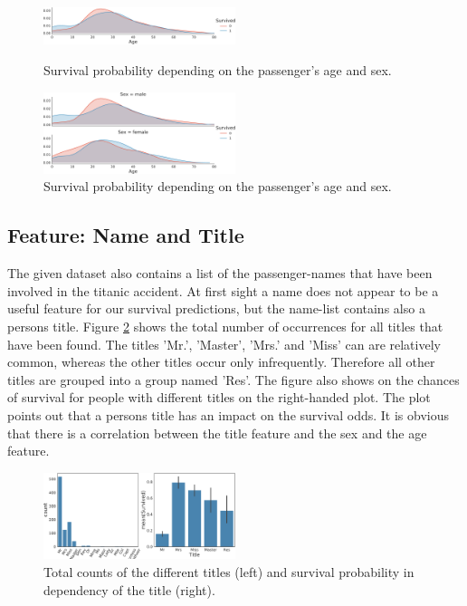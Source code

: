  \begin{figure}

 \centering
     \includegraphics[width=0.5\textwidth]{media_saved/age_all}
     \caption{Survival probability depending on the passenger's age and sex.}
     \label{fig:agesexfeat}
     \includegraphics[width=0.5\textwidth]{media_saved/age_sex}
     \caption{Survival probability depending on the passenger's age and sex.}
     \label{fig:ageallfeat}
 \end{figure}
 
 \subsection{Feature: Name and Title}
The given dataset also contains a list of the passenger-names that have been involved in the titanic accident. At first sight a name does not appear to be a useful feature for our survival predictions, but the name-list contains also a persons title. Figure \ref{fig:title} shows the total number of occurrences for all titles that have been found. The titles 'Mr.', 'Master', 'Mrs.' and 'Miss' can are relatively common, whereas the other titles occur only infrequently. Therefore all other titles are grouped into a group named 'Res'. The figure also shows on the chances of survival for people with different titles on the right-handed plot. The plot points out that a persons title has an impact on the survival odds. It is obvious that there is a correlation between the title feature and the sex and the age feature.

 \begin{figure}
 \centering
     \includegraphics[width=0.5\textwidth]{media_saved/title}
     \caption{Total counts of the different titles (left) and survival probability in dependency of the title (right).}
     \label{fig:title}
 \end{figure}
 
